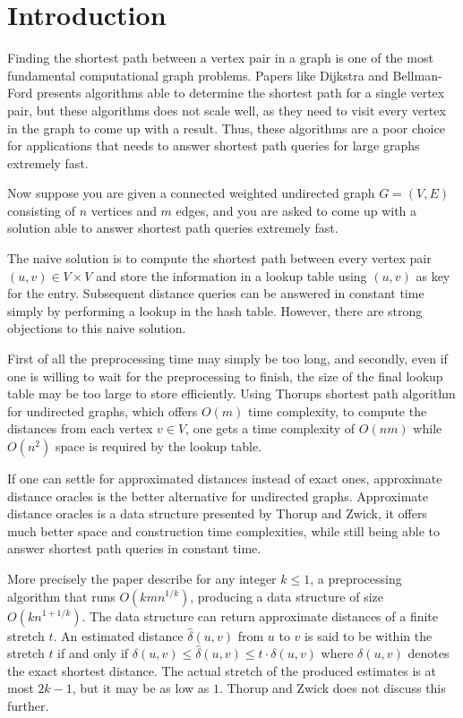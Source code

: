 \chapter{Introduction}
\label{sec:introduction}

Finding the shortest path between a vertex pair in a graph is one
of the most fundamental computational graph problems. Papers like
Dijkstra\cite{Dijkstra59anote} and Bellman-Ford\cite{bellman} presents
algorithms able to determine the shortest path for a single vertex pair, but
these algorithms does not scale well, as they need to visit every vertex in
the graph to come up with a result. Thus, these algorithms are a poor choice
for applications that needs to answer shortest path queries for large graphs
extremely fast.

Now suppose you are given a connected weighted undirected graph $G=(V,E)$
consisting of $n$ vertices and $m$ edges, and you are asked to come up with a
solution able to answer shortest path queries extremely fast.

The naive solution is to compute the shortest path between every vertex pair
$(u,v) \in V \times V$ and store the information in a lookup table using
$(u,v)$ as key for the entry. Subsequent distance queries can be answered in
constant time simply by performing a lookup in the hash table.
However, there are strong objections to this naive solution.

First of all the preprocessing time may simply be too long, and secondly,
even if one is willing to wait for the preprocessing to finish, the size of
the final lookup table may be too large to store efficiently. Using Thorups
shortest path algorithm for undirected graphs\cite{thorupsssp}, which offers
$O(m)$ time complexity, to compute the distances from each vertex $v\in V$,
one gets a time complexity of $O(nm)$ while $O(n^2)$ space is required by the
lookup table.

If one can settle for approximated distances instead of exact ones,
approximate distance oracles is the better alternative for undirected
graphs. Approximate distance oracles is a data structure presented by Thorup
and Zwick\cite{tu}, it offers much better space and construction time
complexities, while still being able to answer shortest path queries in
constant time.

More precisely the paper describe for any integer $k \leq 1$, a preprocessing
algorithm that runs $O(kmn^{1/k})$, producing a data structure of size
$O(kn^{1+1/k})$. The data structure can return approximate distances of a
finite stretch $t$. An estimated distance $\hat{\delta}(u,v)$ from $u$ to $v$
is said to be within the stretch $t$ if and only if $\delta(u,v)\leq
\hat{\delta}(u,v)\leq t \cdot\delta(u,v)$ where $\delta(u,v)$ denotes the
exact shortest distance. The actual stretch of the produced estimates is
at most $2k-1$, but it may be as low as $1$. Thorup and Zwick does not discuss
this further.

